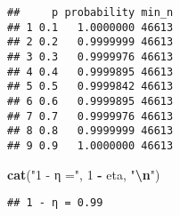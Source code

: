 \documentclass[
]{article}
\newenvironment{Shaded}{\begin{snugshade}}{\end{snugshade}}
\newcommand{\DecValTok}[1]{\textcolor[rgb]{0.00,0.00,0.81}{#1}}
\newcommand{\FunctionTok}[1]{\textcolor[rgb]{0.13,0.29,0.53}{\textbf{#1}}}
\newcommand{\NormalTok}[1]{#1}
\newcommand{\SpecialCharTok}[1]{\textcolor[rgb]{0.81,0.36,0.00}{\textbf{#1}}}
\newcommand{\StringTok}[1]{\textcolor[rgb]{0.31,0.60,0.02}{#1}}
\begin{document}
\begin{verbatim}
##     p probability min_n
## 1 0.1   1.0000000 46613
## 2 0.2   0.9999999 46613
## 3 0.3   0.9999976 46613
## 4 0.4   0.9999895 46613
## 5 0.5   0.9999842 46613
## 6 0.6   0.9999895 46613
## 7 0.7   0.9999976 46613
## 8 0.8   0.9999999 46613
## 9 0.9   1.0000000 46613
\end{verbatim}

\begin{Shaded}
\begin{Highlighting}[]
\FunctionTok{cat}\NormalTok{(}\StringTok{"1 {-} η ="}\NormalTok{, }\DecValTok{1} \SpecialCharTok{{-}}\NormalTok{ eta, }\StringTok{"}\SpecialCharTok{\textbackslash{}n}\StringTok{"}\NormalTok{)}
\end{Highlighting}
\end{Shaded}

\begin{verbatim}
## 1 - η = 0.99
\end{verbatim}
\end{document}
